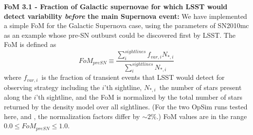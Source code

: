 


{\bf FoM 3.1 - Fraction of Galactic supernovae for which LSST would
  detect variability {\it before} the main Supernova event:} We have
implemented a simple FoM for the Galactic Supernova case, using the
parameters of SN2010mc as an example whose pre-SN outburst could be
discovered first by LSST. The FoM is defined as
\begin{equation}
  FoM_{preSN} \equiv \frac{ \sum^{sightlines}_{i} f_{var, i} N_{\ast, i} } {\sum^{sightlines}_{i} N_{\ast, i}}
\label{eqn:def_FOM_3p1}
\end{equation}
where $f_{var, i}$~is the fraction of transient events that LSST would
detect for observing strategy including the $i$'th sightline,
$N_{\ast,i}$~the number of stars present along the $i$'th sightline,
and the FoM is normalized by the total number of stars returned by the
density model over all sightlines. (For the two OpSim runs tested
here,  and , the
normalization factors differ by $\sim 2\%$.) FoM values are in the
range $0.0 \le FoM_{preSN} \le 1.0$.

